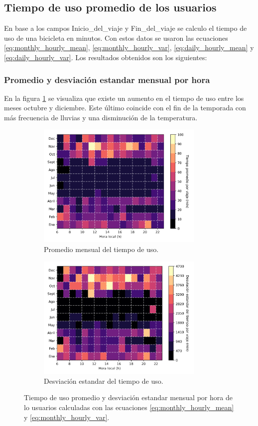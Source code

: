 \subsection{Tiempo de uso promedio de los usuarios}

En base a los campos Inicio\_del\_viaje y Fin\_del\_viaje se calculo el tiempo de uso de una bicicleta en minutos. Con estos datos se usaron las ecuaciones \ref{eq:monthly_hourly_mean}, \ref{eq:monthly_hourly_var}, \ref{eq:daily_hourly_mean} y \ref{eq:daily_hourly_var}. Los resultados obtenidos son los siguientes:

\subsubsection{Promedio y desviación estandar mensual por hora}

En la figura \ref{fig:monthly_hourly_mean_time} se visualiza que existe un aumento en el tiempo de uso entre los meses octubre y diciembre. Este último coincide con el fin de la temporada con más frecuencia de lluvias y una disminución de la temperatura\cite{clima_guadalajara}.

\begin{figure}[H]
    \centering
    \begin{subfigure}[b]{8cm}
        \includegraphics[width=8cm]{Graphics/monthly_hourly_mean_time_travel.png}
        \caption{Promedio mensual del tiempo de uso.}
        \label{fig:monthly_hourly_mean_time}
    \end{subfigure}
    \begin{subfigure}[b]{8cm}
        \includegraphics[width=8cm]{Graphics/monthly_hourly_var_time_travel.png}
        \caption{Desviación estandar del tiempo de uso.}
        \label{fig:monthly_hourly_var_time}
    \end{subfigure}
    \caption{Tiempo de uso promedio y desviación estandar mensual por hora de lo usuarios calculadas con las ecuaciones \ref{eq:monthly_hourly_mean} y \ref{eq:monthly_hourly_var}.}
    \label{fig:monthly_hourly_time}
\end{figure}

